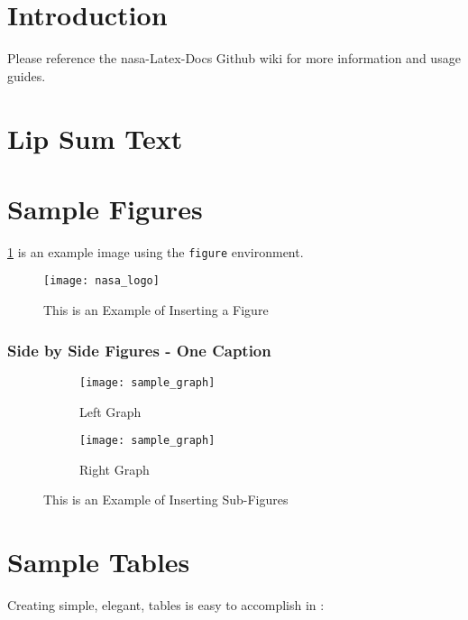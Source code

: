 \documentclass[]{nasa-latex-docs}
\begin{document}
\section{Introduction}

Please reference the \acrshort{nasa}-Latex-Docs Github wiki\cite{Template-Guide} for more information and usage guides.

\section{Lip Sum Text}

\lipsum[1-4]

\section{Sample Figures}

\ref{fig:NASA_logo} is an example image using the \texttt{figure} environment.

\begin{figure}[H]
   \texttt{[image: nasa\_logo]} 
   \caption{This is an Example of Inserting a Figure}
   \label{fig:NASA_logo}
\end{figure}

\subsubsection{Side by Side Figures - One Caption}

\begin{figure}[H]
\begin{subfigure}[b]{0.49\textwidth}
   \centering
   \texttt{[image: sample\_graph]}
   \caption{Left Graph}
   \label{fig:sample_graph_L}
\end{subfigure}
\begin{subfigure}[b]{0.49\textwidth}
   \centering
   \texttt{[image: sample\_graph]}
   \caption{Right Graph}
   \label{fig:sample_graph_R}
\end{subfigure}
\caption{This is an Example of Inserting Sub-Figures}
   \label{fig:sub_figures}
\end{figure}

\section{Sample Tables}

Creating simple, elegant, tables is easy to accomplish in \latex:
\end{document}
